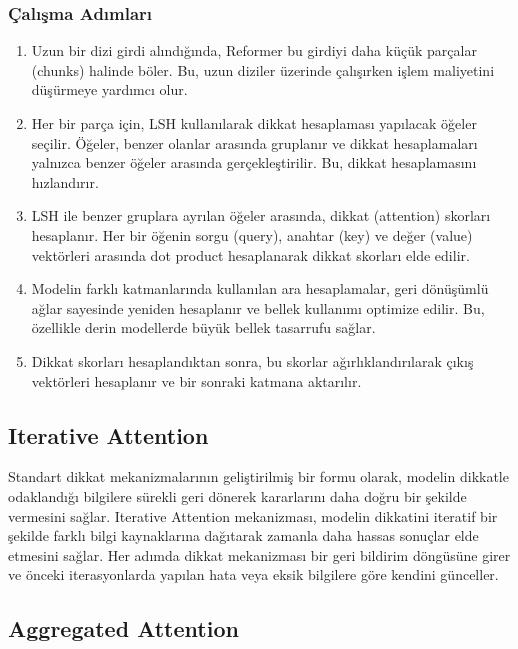 \subsubsection{Çalışma Adımları}

\begin{enumerate}
    \item Uzun bir dizi girdi alındığında, Reformer bu girdiyi daha küçük parçalar (chunks) halinde böler. Bu, uzun diziler üzerinde çalışırken işlem maliyetini düşürmeye yardımcı olur.
    \item Her bir parça için, LSH kullanılarak dikkat hesaplaması yapılacak öğeler seçilir. Öğeler, benzer olanlar arasında gruplanır ve dikkat hesaplamaları yalnızca benzer öğeler arasında gerçekleştirilir. Bu, dikkat hesaplamasını hızlandırır.
    \item LSH ile benzer gruplara ayrılan öğeler arasında, dikkat (attention) skorları hesaplanır. Her bir öğenin sorgu (query), anahtar (key) ve değer (value) vektörleri arasında dot product hesaplanarak dikkat skorları elde edilir.
    \item Modelin farklı katmanlarında kullanılan ara hesaplamalar, geri dönüşümlü ağlar sayesinde yeniden hesaplanır ve bellek kullanımı optimize edilir. Bu, özellikle derin modellerde büyük bellek tasarrufu sağlar.
    \item Dikkat skorları hesaplandıktan sonra, bu skorlar ağırlıklandırılarak çıkış vektörleri hesaplanır ve bir sonraki katmana aktarılır.
\end{enumerate}

\newpage

\subsection{Iterative Attention}

Standart dikkat mekanizmalarının geliştirilmiş bir formu olarak, modelin dikkatle odaklandığı bilgilere sürekli geri dönerek kararlarını daha doğru bir şekilde vermesini sağlar. Iterative Attention mekanizması, modelin dikkatini iteratif bir şekilde farklı bilgi kaynaklarına dağıtarak zamanla daha hassas sonuçlar elde etmesini sağlar. Her adımda dikkat mekanizması bir geri bildirim döngüsüne girer ve önceki iterasyonlarda yapılan hata veya eksik bilgilere göre kendini günceller.

\newpage

\subsection{Aggregated Attention}


